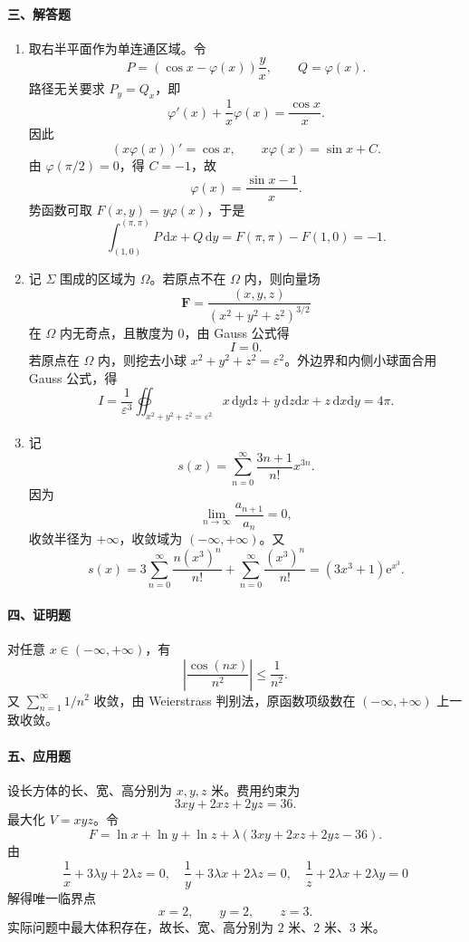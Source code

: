 \paragraph*{三、解答题}
\begin{enumerate}
  \item 取右半平面作为单连通区域。令
  \[
    P=\left(\cos x-\varphi(x)\right)\frac yx,\qquad Q=\varphi(x).
  \]
  路径无关要求 \(P_y=Q_x\)，即
  \[
    \varphi'(x)+\frac1x\varphi(x)=\frac{\cos x}{x}.
  \]
  因此
  \[
    (x\varphi(x))'=\cos x,\qquad
    x\varphi(x)=\sin x+C.
  \]
  由 \(\varphi(\pi/2)=0\)，得 \(C=-1\)，故
  \[
    \varphi(x)=\frac{\sin x-1}{x}.
  \]
  势函数可取 \(F(x,y)=y\varphi(x)\)，于是
  \[
    \int_{(1,0)}^{(\pi,\pi)}P\,\mathrm{d}x+Q\,\mathrm{d}y
    =F(\pi,\pi)-F(1,0)=-1.
  \]

  \item 记 \(\Sigma\) 围成的区域为 \(\Omega\)。若原点不在 \(\Omega\) 内，则向量场
  \[
    \mathbf F=\frac{(x,y,z)}{(x^2+y^2+z^2)^{3/2}}
  \]
  在 \(\Omega\) 内无奇点，且散度为 \(0\)，由 Gauss 公式得
  \[
    I=0.
  \]
  若原点在 \(\Omega\) 内，则挖去小球 \(x^2+y^2+z^2=\varepsilon^2\)。外边界和内侧小球面合用 Gauss 公式，得
  \[
    I=\frac1{\varepsilon^3}\oiint_{x^2+y^2+z^2=\varepsilon^2}
    x\,\mathrm{d}y\mathrm{d}z+y\,\mathrm{d}z\mathrm{d}x+z\,\mathrm{d}x\mathrm{d}y
    =4\pi.
  \]

  \item 记
  \[
    s(x)=\sum_{n=0}^{\infty}\frac{3n+1}{n!}x^{3n}.
  \]
  因为
  \[
    \lim_{n\to\infty}\frac{a_{n+1}}{a_n}=0,
  \]
  收敛半径为 \(+\infty\)，收敛域为 \((-\infty,+\infty)\)。又
  \[
    s(x)=3\sum_{n=0}^{\infty}\frac{n(x^3)^n}{n!}
    +\sum_{n=0}^{\infty}\frac{(x^3)^n}{n!}
    =(3x^3+1)\mathrm{e}^{x^3}.
  \]
\end{enumerate}

\paragraph*{四、证明题}
对任意 \(x\in(-\infty,+\infty)\)，有
\[
  \left|\frac{\cos(nx)}{n^2}\right|\le\frac1{n^2}.
\]
又 \(\sum_{n=1}^{\infty}1/n^2\) 收敛，由 Weierstrass 判别法，原函数项级数在 \((-\infty,+\infty)\) 上一致收敛。

\paragraph*{五、应用题}
设长方体的长、宽、高分别为 \(x,y,z\) 米。费用约束为
\[
  3xy+2xz+2yz=36.
\]
最大化 \(V=xyz\)。令
\[
  F=\ln x+\ln y+\ln z+\lambda(3xy+2xz+2yz-36).
\]
由
\[
  \frac1x+3\lambda y+2\lambda z=0,\quad
  \frac1y+3\lambda x+2\lambda z=0,\quad
  \frac1z+2\lambda x+2\lambda y=0
\]
解得唯一临界点
\[
  x=2,\qquad y=2,\qquad z=3.
\]
实际问题中最大体积存在，故长、宽、高分别为 \(2\) 米、\(2\) 米、\(3\) 米。

